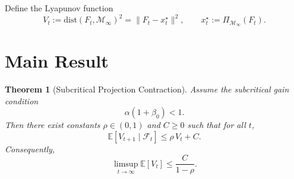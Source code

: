 \documentclass[11pt]{article}
\newtheorem{theorem}{Theorem}[section]
\begin{document}
Define the Lyapunov function
\[
V_t := \mathrm{dist}(F_t,\mathcal{M}_\infty)^2 = \|F_t - x_t^\star\|^2,
\qquad x_t^\star := \Pi_{\mathcal{M}_\infty}(F_t).
\]

\section{Main Result}

\begin{theorem}[Subcritical Projection Contraction]\label{thm:contraction}
Assume the subcritical gain condition
\[
\alpha(1+\beta_0) < 1 .
\]
Then there exist constants \(\rho \in (0,1)\) and \(C \ge 0\) such that for all \(t\),
\[
\mathbb{E}[V_{t+1} \mid \mathcal{F}_t] \le \rho\,V_t + C .
\]
Consequently,
\[
\limsup_{t\to\infty} \mathbb{E}[V_t] \le \frac{C}{1-\rho}.
\]
\end{theorem}
\end{document}
